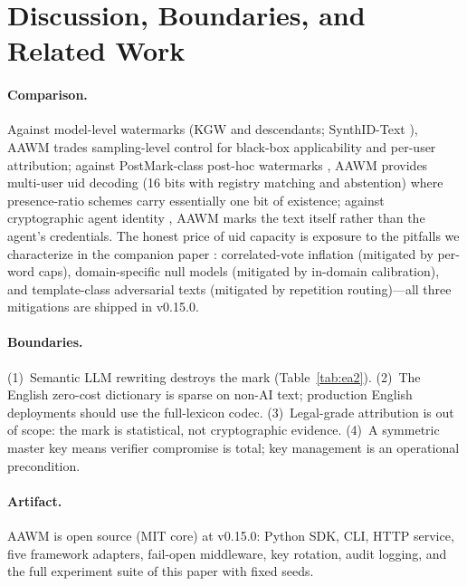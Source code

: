 \section{Discussion, Boundaries, and Related Work}
\label{sec:discussion}

\paragraph{Comparison.}
Against model-level watermarks (KGW \cite{kgw} and descendants; SynthID-Text \cite{synthid}), AAWM
trades sampling-level control for black-box applicability and per-user
attribution; against PostMark-class post-hoc watermarks \cite{postmark}, AAWM provides
multi-user uid decoding (16 bits with registry matching and abstention)
where presence-ratio schemes \cite{postmark,simmark} carry essentially one bit of existence;
against cryptographic agent identity \cite{agentpin}, AAWM marks the text itself rather
than the agent's credentials. The honest price of uid capacity is
exposure to the pitfalls we characterize in the companion paper \cite{aawm}:
correlated-vote inflation (mitigated by per-word caps), domain-specific
null models (mitigated by in-domain calibration), and template-class
adversarial texts (mitigated by repetition routing)---all three mitigations
are shipped in v0.15.0.

\paragraph{Boundaries.}
(1)~Semantic LLM rewriting destroys the mark (Table~\ref{tab:ea2}).
(2)~The English zero-cost dictionary is sparse on non-AI text; production
English deployments should use the full-lexicon codec.
(3)~Legal-grade attribution is out of scope: the mark is statistical, not
cryptographic evidence.
(4)~A symmetric master key means verifier compromise is total; key
management is an operational precondition.

\paragraph{Artifact.}
AAWM is open source (MIT core) at v0.15.0: Python SDK, CLI, HTTP service,
five framework adapters, fail-open middleware, key rotation, audit
logging, and the full experiment suite of this paper with fixed seeds.
